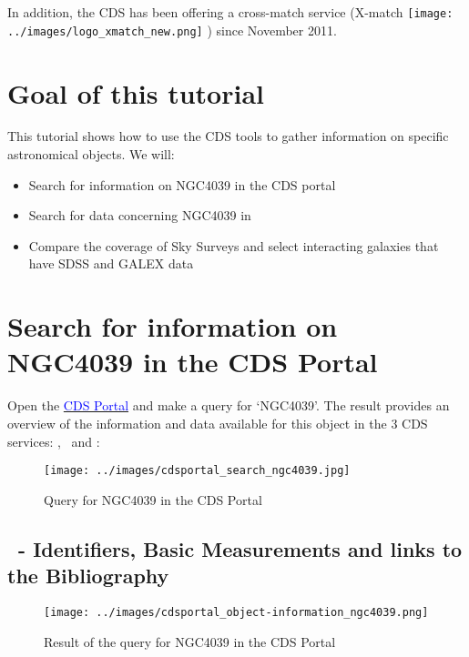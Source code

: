 \documentclass [a4paper, 12pt]{article}
\begin{document}
In addition, the CDS has been offering a cross-match service
(X-match \texttt{[image: ../images/logo\_xmatch\_new.png]} ) since November 2011.

\section{Goal of this tutorial}

This tutorial shows how to use the CDS tools to gather information on
specific astronomical objects. We will:
\begin{itemize}
\item Search for information on NGC4039 in the CDS portal
\item Search for data concerning NGC4039 in \aladin\
\item Compare the coverage of Sky Surveys and select interacting
galaxies that have SDSS and GALEX data
\end{itemize}

\section{Search for information on NGC4039 in the CDS Portal}

Open the \href{http://cdsportal.u-strasbg.fr/}{\textcolor{blue}{CDS Portal}}
and make a query for `NGC4039'.
The result provides an overview of the information and data available for
this object in the 3 CDS services: \simbad, \aladin\ and \vizier:

\begin{figure}[H]
\center
\texttt{[image: ../images/cdsportal\_search\_ngc4039.jpg]}
\caption{Query for NGC4039 in the CDS Portal}
\label{fig:cdsportal1}
\end{figure}

\subsection{\simbad\ - Identifiers, Basic Measurements and links to the
Bibliography}

\begin{figure}[H]
    \center
    \texttt{[image: ../images/cdsportal\_object-information\_ngc4039.png]}
    \caption{Result of the query for NGC4039 in the CDS Portal}
    \label{fig:cdsportal2}
\end{figure}
\end{document}
